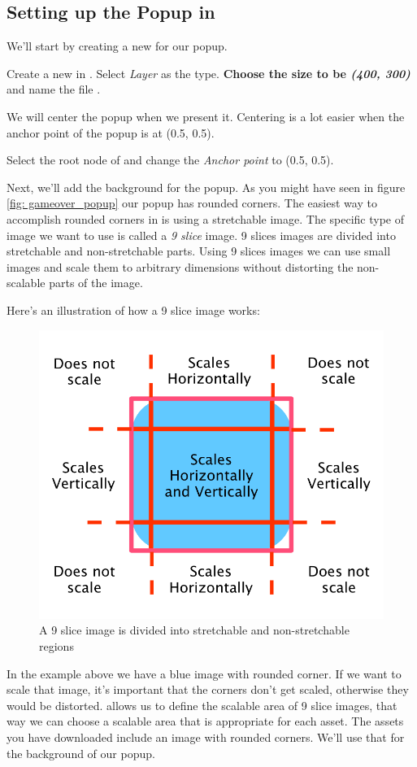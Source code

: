 \subsection{Setting up the Popup in \SB{}}
We'll start by creating a new \ccbfile{} for our popup.
\begin{leftbar}
Create a new \ccbfile{} in \SB{}. Select \textit{Layer} as the type.
\textbf{Choose the size to be \textit{(400, 300)}} and name the file
.
\end{leftbar}
We will center the popup when we present it. Centering is a lot easier when the
anchor point of the popup is at (0.5, 0.5).
\begin{leftbar}
Select the root node of  and change the
\textit{Anchor point} to (0.5, 0.5).
\end{leftbar} 
Next, we'll add the background for the popup. As you might have seen in figure
\ref{fig: gameover_popup} our popup has rounded corners. The easiest way to
accomplish rounded corners in \cocos{} is using a stretchable image.
 The specific type of image we want to use is called a \textit{9 slice} image. 9
 slices images are divided into stretchable and non-stretchable parts. Using 9 slices images we can
use small images and scale them to arbitrary dimensions without distorting the
non-scalable parts of the image.

Here's an illustration of how a 9 slice image works:
\begin{figure}[H]
    \centering
    \includegraphics[width=0.5\linewidth]{images/Chapter7/9_slice.png}
    \caption{A 9 slice image is divided into stretchable and non-stretchable
    regions}
\end{figure}

In the example above we have a blue image with rounded corner. If we want to
scale that image, it's important that the corners don't get scaled, otherwise
they would be distorted. \SB{} allows us to define the scalable area of 9 slice
images, that way we can choose a scalable area that is appropriate for each
asset. The assets you have downloaded include an image with rounded corners.
We'll use that for the background of our popup.

